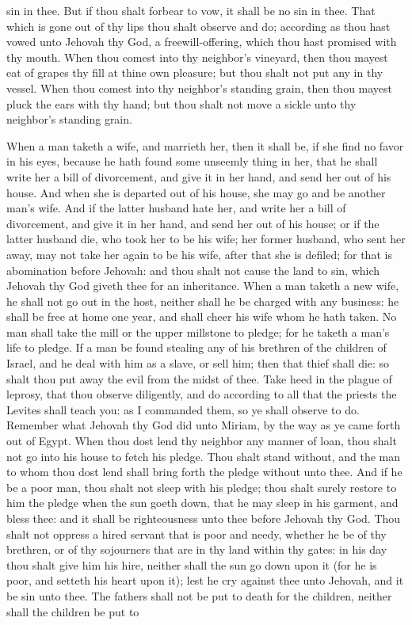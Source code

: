 sin in thee. But if thou shalt forbear to vow, it shall be no sin in thee. That which is gone out of thy lips thou shalt observe and do; according as thou hast vowed unto Jehovah thy God, a freewill-offering, which thou hast promised with thy mouth.  When thou comest into thy neighbor’s vineyard, then thou mayest eat of grapes thy fill at thine own pleasure; but thou shalt not put any in thy vessel. When thou comest into thy neighbor’s standing grain, then thou mayest pluck the ears with thy hand; but thou shalt not move a sickle unto thy neighbor’s standing grain. 

When a man taketh a wife, and marrieth her, then it shall be, if she find no favor in his eyes, because he hath found some unseemly thing in her, that he shall write her a bill of divorcement, and give it in her hand, and send her out of his house. And when she is departed out of his house, she may go and be another man’s wife. And if the latter husband hate her, and write her a bill of divorcement, and give it in her hand, and send her out of his house; or if the latter husband die, who took her to be his wife; her former husband, who sent her away, may not take her again to be his wife, after that she is defiled; for that is abomination before Jehovah: and thou shalt not cause the land to sin, which Jehovah thy God giveth thee for an inheritance.  When a man taketh a new wife, he shall not go out in the host, neither shall he be charged with any business: he shall be free at home one year, and shall cheer his wife whom he hath taken.  No man shall take the mill or the upper millstone to pledge; for he taketh a man’s life to pledge.  If a man be found stealing any of his brethren of the children of Israel, and he deal with him as a slave, or sell him; then that thief shall die: so shalt thou put away the evil from the midst of thee.  Take heed in the plague of leprosy, that thou observe diligently, and do according to all that the priests the Levites shall teach you: as I commanded them, so ye shall observe to do. Remember what Jehovah thy God did unto Miriam, by the way as ye came forth out of Egypt.  When thou dost lend thy neighbor any manner of loan, thou shalt not go into his house to fetch his pledge. Thou shalt stand without, and the man to whom thou dost lend shall bring forth the pledge without unto thee. And if he be a poor man, thou shalt not sleep with his pledge; thou shalt surely restore to him the pledge when the sun goeth down, that he may sleep in his garment, and bless thee: and it shall be righteousness unto thee before Jehovah thy God.  Thou shalt not oppress a hired servant that is poor and needy, whether he be of thy brethren, or of thy sojourners that are in thy land within thy gates: in his day thou shalt give him his hire, neither shall the sun go down upon it (for he is poor, and setteth his heart upon it); lest he cry against thee unto Jehovah, and it be sin unto thee.  The fathers shall not be put to death for the children, neither shall the children be put to 